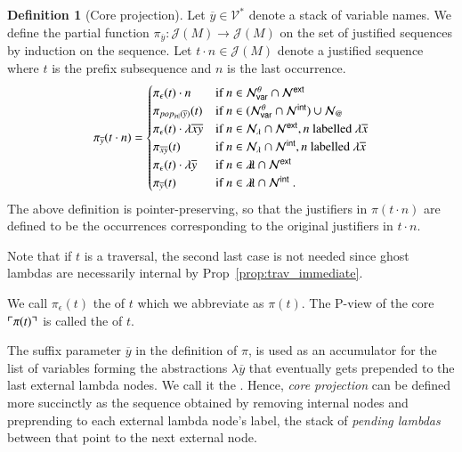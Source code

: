 \documentclass{elsarticle}
\makeatletter
\theoremstyle{plain}
\theoremstyle{definition}
\newtheorem{definition}{Definition}[section]
\theoremstyle{remark}
\newcommand\VarSet{\mathcal{V}}
\newcommand\Nodes{\mathcal{N}}%
\newcommand\NodesVar{\Nodes_{\sf var}}%
\newcommand\NodesLmd{\Nodes_\lambda}%
\newcommand\NodesApp{\Nodes_@}%
\newcommand{\ghostlmd}{{\lambda\!\!\lambda}}
\newcommand{\ghostvar}{\theta}
\newcommand\ImNodesVar{\NodesVar^\ghostvar}
\def\coresymbol{\pi} %
\newcommand{\core}[1]{\coresymbol(#1)} %
\newcommand{\ExtNodes}{\Nodes^{\sf ext}}
\newcommand{\IntNodes}{\Nodes^{\sf int}}
\def\justseqset{\mathcal{J}}
\makeatother
\begin{document}
\begin{definition}[Core projection]
\label{def:coreprojection}
Let $\overline{y} \in \VarSet^*$ denote a stack of variable names.
We define the partial function $\coresymbol_{\overline{y}}\colon \justseqset(M) \longrightarrow \justseqset(M)$ on the set of justified sequences by induction on the sequence.
Let $t \cdot n\in\justseqset(M)$ denote a justified sequence where $t$ is the prefix subsequence and $n$ is the last occurrence.
\begin{equation*}
\coresymbol_{\overline{y}}(t\cdot n) =
\begin{cases}
\coresymbol_{\epsilon}(t) \cdot n
    & \mbox{if } n\in\ImNodesVar\inter\ExtNodes \\
\coresymbol_{pop_{|n|}(\overline{y})}(t)
    & \mbox{if } n\in(\ImNodesVar\inter\IntNodes)\union\NodesApp \\
\coresymbol_{\epsilon}(t) \cdot \lambda \overline{x}\overline{y}
    & \mbox{if } n\in\NodesLmd\inter\ExtNodes, n \mbox{ labelled } \lambda\overline{x}\\
\coresymbol_{\overline{x} \overline{y}}(t)
    & \mbox{if } n\in\NodesLmd\inter\IntNodes, n \mbox{ labelled } \lambda\overline{x} \\
\coresymbol_{\epsilon}(t) \cdot\lambda\overline{y}
    & \mbox{if } n\in\ghostlmd\inter\ExtNodes \\
\coresymbol_{\overline{y}}(t)
    & \mbox{if } n\in\ghostlmd\inter\IntNodes \ .
\end{cases}
\end{equation*}
The above definition is pointer-preserving, so that the justifiers in $\coresymbol(t\cdot n)$ are defined to be the occurrences corresponding to the original justifiers in $t \cdot n$.

Note that if $t$ is a traversal, the second last case is not needed since ghost lambdas are necessarily internal by Prop~\ref{prop:trav_immediate}.

We call $\coresymbol_\epsilon(t)$ the  of $t$ which we abbreviate as $\core{t}$. The P-view of the core $\pview{\core{t}}$ is called the  of $t$.
\end{definition}

The suffix parameter $\overline{y}$ in the definition of $\coresymbol$, is used as an accumulator for the list of variables forming the abstractions $\lambda \overline{y}$ that eventually gets prepended to the last external lambda nodes. We call it the . Hence, \emph{core projection} can be defined more succinctly as the sequence obtained by removing internal nodes and preprending to each external lambda node's label, the stack of \emph{pending lambdas} between that point to the next external node.
\end{document}
